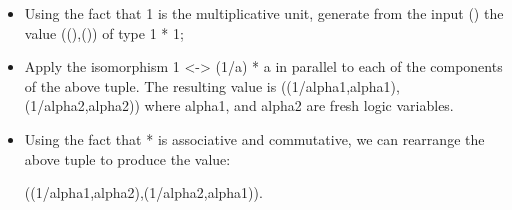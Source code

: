 \documentclass[preprint]{sigplanconf}
\begin{document}
\begin{itemize}
\item Using the fact that {{1}} is the multiplicative unit, generate
  from the input {{()}} the value {{((),())}} of type {{1 * 1}};
\item Apply the isomorphism {{1 <-> (1/a) * a}} in parallel to each of
  the components of the above tuple. The resulting value is
  {{((1/alpha1,alpha1),(1/alpha2,alpha2))}} where {{alpha1}}, and
  {{alpha2}} are fresh logic variables.
\item Using the fact that {{*}} is associative and commutative, we can
  rearrange the above tuple to produce the value:

{{((1/alpha1,alpha2),(1/alpha2,alpha1))}}.





\end{itemize}
\end{document}
